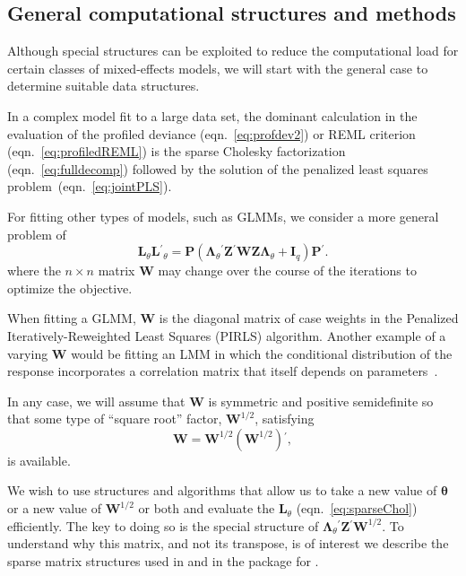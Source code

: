 \documentclass{jss}
\newcommand{\bLt}{\ensuremath{\bm\Lambda_\theta}}
\newcommand{\trans}{\ensuremath{^\prime}}
\begin{document}
\subsection{General computational structures and methods}
\label{sec:generalcomputational}

Although special structures can be exploited to reduce the
computational load for certain classes of mixed-effects models, we
will start with the general case to determine suitable data
structures.  

In a complex model fit to a large data set, the dominant calculation
in the evaluation of the profiled deviance (eqn.~\ref{eq:profdev2}) or
REML criterion (eqn.~\ref{eq:profiledREML}) is the sparse Cholesky
factorization (eqn.~\ref{eq:fulldecomp}) followed by the solution of
the penalized least squares problem~(eqn.~\ref{eq:jointPLS}).

For fitting other types of models, such as GLMMs, we consider a more
general problem of%
\begin{equation}
  \label{eq:sparseCholW}
  \bm L_\theta\bm L\trans_\theta=\bm P
  \left(\bLt\trans\bm Z\trans\bm W\bm Z\bLt+\bm I_q\right)
  \bm P\trans.
\end{equation}%
where the $n\times n$ matrix $\bm W$ may change over the course of the
iterations to optimize the objective.

When fitting a GLMM, $\bm W$ is the diagonal matrix of case weights in
the Penalized Iteratively-Reweighted Least Squares (PIRLS) algorithm.
Another example of a varying $\bm W$ would be fitting an LMM in which
the conditional distribution of the response incorporates a
correlation matrix that itself depends on
parameters~\citep[Ch.~5]{R:Pinheiro+Bates:2000}.

In any case, we will assume that $\bm W$ is symmetric and 
positive semidefinite so that some type of ``square root'' factor,
$\bm W^{1/2}$, satisfying%
\begin{equation}
  \label{eq:Wsqrt}
  \bm W = \bm W^{1/2}\left(\bm W^{1/2}\right)\trans,
\end{equation}%
is available.

We wish to use structures and algorithms that allow us to take a new
value of $\bm\theta$ or a new value of $\bm W^{1/2}$ or both and
evaluate the $\bm L_\theta$ (eqn.~\ref{eq:sparseChol})
efficiently.  The key to doing so is the special structure of
$\bLt\trans\bm Z\trans\bm W^{1/2}$.  To understand why this matrix,
and not its transpose, is of interest we describe the sparse
matrix structures used in  and in the 
package for .
\end{document}
